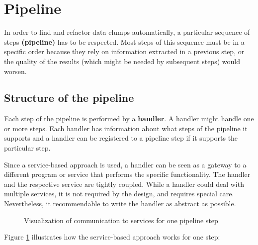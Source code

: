\section{Pipeline}\label{sec:pipeline}
In order to find and refactor data clumps automatically, a particular sequence of steps \textbf{(pipeline)} has to be respected. Most steps of this sequence must be in a specific order because they rely on information extracted in a previous step, or the quality of the results (which might be needed by subsequent steps) would worsen.

\subsection{Structure of the pipeline}
Each step of the pipeline is performed by a  \textbf{handler}. A handler might handle one or more steps.  Each handler has information about what steps of the pipeline it supports and  a handler can be registered to a pipeline step if it supports the particular step.  

Since a service-based approach is used, a handler can be seen as a gateway to a different program or service that performs the specific functionality.  The handler and the respective service are tightly coupled. While a handler could deal with multiple services, it is not required by the design, and requires special care. Nevertheless, it recommendable to write the handler as abstract as possible.
\begin{figure}
    \centering
    
    \caption{Visualization of communication to services for one pipeline step}
    \label{fig:solver_gateway_service_overview}
\end{figure}

Figure \ref{fig:solver_gateway_service_overview} illustrates how the service-based approach works for one step:

